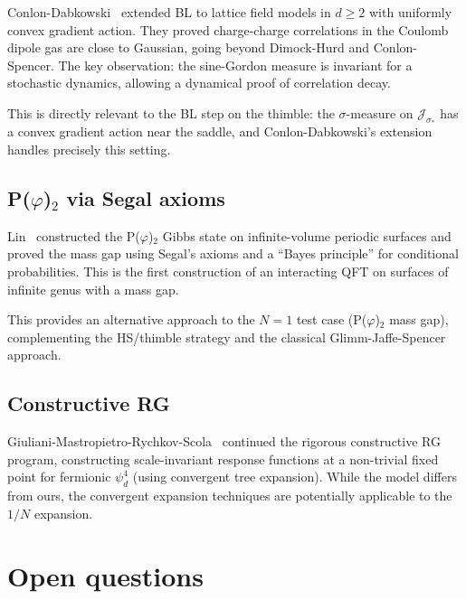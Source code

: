 \documentclass[12pt]{article}
\theoremstyle{definition}
\theoremstyle{remark}
\newcommand{\ph}{\varphi}
\begin{document}
Conlon-Dabkowski~\cite{CD24} extended BL to lattice field models
in $d \ge 2$ with uniformly convex gradient action. They proved
charge-charge correlations in the Coulomb dipole gas are close to
Gaussian, going beyond Dimock-Hurd and Conlon-Spencer. The key
observation: the sine-Gordon measure is invariant for a stochastic
dynamics, allowing a dynamical proof of correlation decay.

This is directly relevant to the BL step on the thimble: the
$\sigma$-measure on $\mathcal{J}_{\sigma_*}$ has a convex gradient
action near the saddle, and Conlon-Dabkowski's extension handles
precisely this setting.

\subsection{P($\ph$)$_2$ via Segal axioms}

Lin~\cite{Lin24} constructed the P($\ph$)$_2$ Gibbs state on
infinite-volume periodic surfaces and proved the mass gap using
Segal's axioms and a ``Bayes principle'' for conditional
probabilities. This is the first construction of an interacting QFT
on surfaces of infinite genus with a mass gap.

This provides an alternative approach to the $N = 1$ test case
(P($\ph$)$_2$ mass gap), complementing the HS/thimble strategy
and the classical Glimm-Jaffe-Spencer approach.

\subsection{Constructive RG}

Giuliani-Mastropietro-Rychkov-Scola~\cite{GMRS24} continued the
rigorous constructive RG program, constructing scale-invariant
response functions at a non-trivial fixed point for fermionic
$\psi^4_d$ (using convergent tree expansion). While the model
differs from ours, the convergent expansion techniques are
potentially applicable to the $1/N$ expansion.

\section{Open questions}
\end{document}
